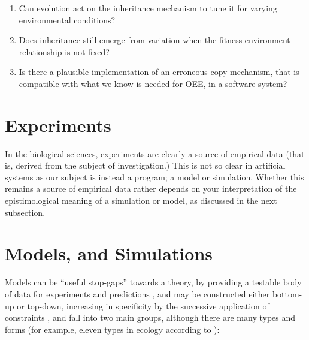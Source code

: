 \vspace{0.3cm}
\begin{minipage}[l]{0.95\textwidth}
	\begin{enumerate}[label=RQ\arabic*:]
		\item Can evolution act on the inheritance mechanism to tune it for varying environmental conditions?
		\item Does inheritance still emerge from variation when the fitness-environment relationship is not fixed?
		\item Is there a plausible implementation of an erroneous copy mechanism, that is compatible with what we know is needed for OEE, in a software system?
	\end{enumerate}
\end{minipage}
\vspace{0.3cm}

\section{Experiments}\label{experiments}

In the biological sciences, experiments are clearly a source of empirical data (that is, derived from the subject of investigation.) This is not so clear in artificial systems as our subject is instead a program; a model or simulation. Whether this remains a source of empirical data rather depends on your interpretation of the epistimological meaning of a simulation or model, as discussed in the next subsection.

\section{Models, and Simulations}\label{models}


Models can be ``useful stop-gaps'' towards a theory, by providing a testable body of data for experiments and predictions \parencite{Krakauer2011}, and may be constructed either bottom-up or top-down, increasing in specificity by the successive application of constraints \parencite{Krakauer2011}, and fall into two main groups, although there are many types and forms (for example, eleven types in ecology according to \parencite{Jorgensen2008}):

